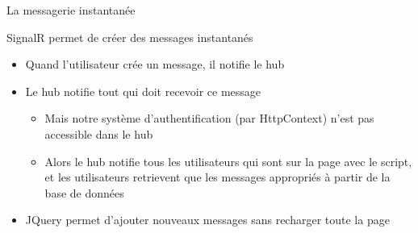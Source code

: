 \begin{frame}{La messagerie instantanée}

  SignalR permet de créer des messages instantanés
  \begin{itemize}
  \item Quand l'utilisateur crée un message, il notifie le hub
  \item Le hub notifie tout qui doit recevoir ce message
    \begin{itemize}
    \item Mais notre système d'authentification (par HttpContext) n'est pas accessible dans le hub
    \item Alors le hub notifie tous les utilisateurs qui sont sur la page avec le script, et les utilisateurs retrievent que les messages appropriés à partir de la base de données
    \end{itemize}
  \item JQuery permet d'ajouter nouveaux messages sans recharger toute la page
  \end{itemize}
\end{frame}